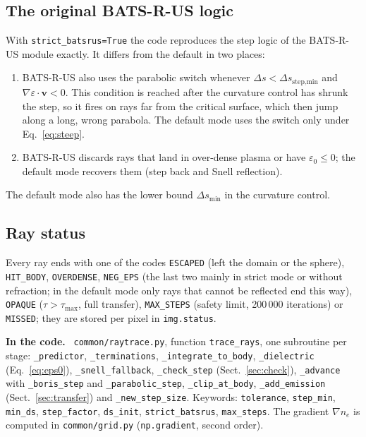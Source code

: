\documentclass[11pt,a4paper]{article}
\newcommand{\code}[1]{\texttt{#1}}
\newcommand{\vect}[1]{\bm{#1}}
\newenvironment{incode}{\par\smallskip\noindent\begin{minipage}{\linewidth}\small\color{accent!80!black}\textbf{In the code.}~}{\end{minipage}\par\smallskip}
\begin{document}
\subsection{The original BATS-R-US logic}\label{sec:strict}
With \code{strict\_batsrus=True} the code reproduces the step logic of the BATS-R-US module
exactly. It differs from the default in two places:
\begin{enumerate}
  \item BATS-R-US also uses the parabolic switch whenever $\Delta s<\Delta s_\text{step,min}$
        and $\nabla\varepsilon\cdot\vect v<0$. This condition is reached after the curvature
        control has shrunk the step, so it fires on rays far from the critical surface, which then
        jump along a long, wrong parabola. The default mode uses the switch only under
        Eq.~\eqref{eq:steep}.
  \item BATS-R-US discards rays that land in over-dense plasma or have $\varepsilon_0\le0$; the
        default mode recovers them (step back and Snell reflection).
\end{enumerate}
The default mode also has the lower bound $\Delta s_\text{min}$ in the curvature control.

\subsection{Ray status}
Every ray ends with one of the codes \code{ESCAPED} (left the domain or the sphere),
\code{HIT\_BODY}, \code{OVERDENSE}, \code{NEG\_EPS} (the last two mainly in strict mode or without
refraction; in the default mode only rays that cannot be reflected end this way), \code{OPAQUE} ($\tau>\tau_\text{max}$, full transfer), \code{MAX\_STEPS} (safety limit,
200\,000 iterations) or \code{MISSED}; they are stored per pixel in \code{img.status}.

\begin{incode}
\code{common/raytrace.py}, function \code{trace\_rays}, one subroutine per stage:
\code{\_predictor}, \code{\_terminations}, \code{\_integrate\_to\_body}, \code{\_dielectric}
(Eq.~\ref{eq:eps0}), \code{\_snell\_fallback}, \code{\_check\_step} (Sect.~\ref{sec:check}),
\code{\_advance} with \code{\_boris\_step} and \code{\_parabolic\_step}, \code{\_clip\_at\_body},
\code{\_add\_emission} (Sect.~\ref{sec:transfer}) and \code{\_new\_step\_size}. Keywords:
\code{tolerance}, \code{step\_min}, \code{min\_ds}, \code{step\_factor}, \code{ds\_init},
\code{strict\_batsrus}, \code{max\_steps}. The gradient $\nabla n_e$ is computed in
\code{common/grid.py} (\code{np.gradient}, second order).
\end{incode}
\end{document}
